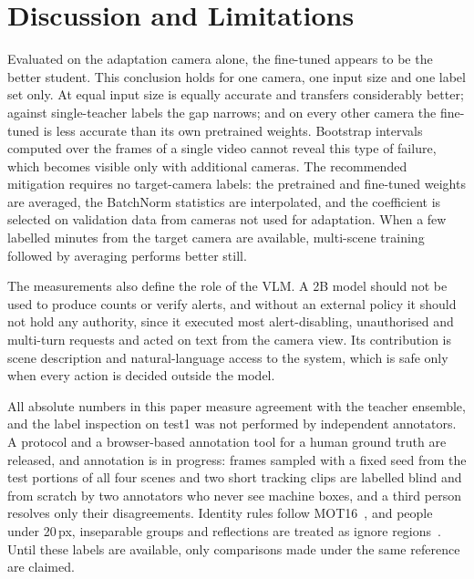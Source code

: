 \section{Discussion and Limitations}
\label{sec:discussion}
Evaluated on the adaptation camera alone, the fine-tuned \yolo{} appears to be the better student. This conclusion
holds for one camera, one input size and one label set only. At equal input size \rfdetr{} is equally accurate and
transfers considerably better; against single-teacher labels the gap narrows; and on every other camera the
fine-tuned \yolo{} is less accurate than its own pretrained weights. Bootstrap intervals computed over the frames of
a single video cannot reveal this type of failure, which becomes visible only with additional cameras. The
recommended mitigation requires no target-camera labels: the pretrained and fine-tuned weights are averaged, the
BatchNorm statistics are interpolated, and the coefficient is selected on validation data from cameras not used for
adaptation. When a few labelled minutes from the target camera are available, multi-scene training followed by
averaging performs better still.

The measurements also define the role of the VLM. A 2B model should not be used to produce counts or verify alerts,
and without an external policy it should not hold any authority, since it executed most alert-disabling,
unauthorised and multi-turn requests and acted on text from the camera view. Its contribution is scene description
and natural-language access to the system, which is safe only when every action is decided outside the model.

All absolute numbers in this paper measure agreement with the teacher ensemble, and the label inspection on test1 was
not performed by independent annotators. A protocol and a browser-based annotation tool for a human ground truth are
released, and annotation is in progress: \HuFramesPlanned{} frames sampled with a fixed seed from the test portions
of all four scenes and two short tracking clips are labelled blind and from scratch by two annotators who never see
machine boxes, and a third person resolves only their disagreements. Identity rules follow
MOT16~\cite{milan2016mot16}, and people under 20\,px, inseparable groups and reflections are treated as ignore
regions~\cite{dollar2012pedestrian}. Until these labels are available, only comparisons made under the same reference
are claimed.

